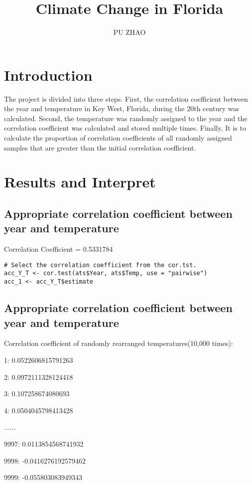 \documentclass[a4paper, 11pt]{article}
\title{Climate Change in Florida}
\author{PU ZHAO}
\date{}
\begin{document}
\maketitle

\section{Introduction}

The project is divided into three steps. First, the correlation coefficient between the year and temperature in Key West, Florida, during the 20th century was calculated. Second, the temperature was randomly assigned to the year and the correlation coefficient was calculated and stored multiple times. Finally, It is to calculate the proportion of correlation coefficients of all randomly assigned samples that are greater than the initial correlation coefficient.

\section{Results and Interpret}

\subsection{Appropriate correlation coefficient between year and temperature}

Correlation Coefficient = 0.5331784 
\begin{lstlisting}[style=Rstyle]
# Select the correlation coefficient from the cor.tst.
acc_Y_T <- cor.test(ats$Year, ats$Temp, use = "pairwise")
acc_1 <- acc_Y_T$estimate 
\end{lstlisting}

\subsection{Appropriate correlation coefficient between year and temperature}
Correlation coefficient of randomly rearranged temperatures(10,000 times):

1: 0.0522606815791263  

2: 0.0972111328124418

3: 0.107258674080693

4: 0.0504045798413428

......

9997: 0.0113854568741932

9998: -0.0416276192579462

9999: -0.055803083949343
\end{document}
